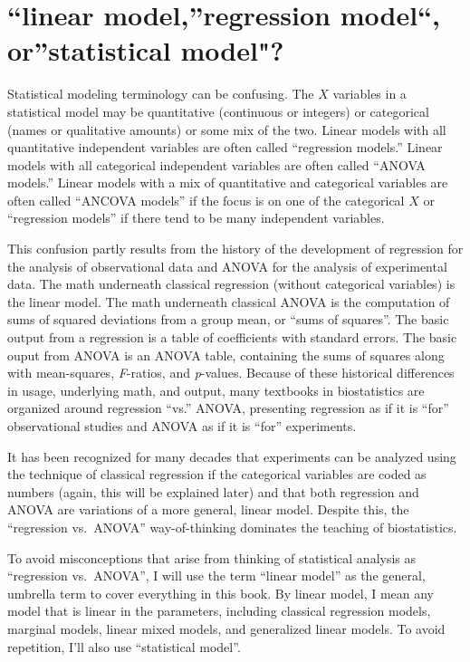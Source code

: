 \documentclass[]{book}
\begin{document}
\hypertarget{linear-modelregression-model-orstatistical-model}{%
\section{``linear model,''regression model``, or''statistical model"?}\label{linear-modelregression-model-orstatistical-model}}

Statistical modeling terminology can be confusing. The \(X\) variables in a statistical model may be quantitative (continuous or integers) or categorical (names or qualitative amounts) or some mix of the two. Linear models with all quantitative independent variables are often called ``regression models.'' Linear models with all categorical independent variables are often called ``ANOVA models.'' Linear models with a mix of quantitative and categorical variables are often called ``ANCOVA models'' if the focus is on one of the categorical \(X\) or ``regression models'' if there tend to be many independent variables.

This confusion partly results from the history of the development of regression for the analysis of observational data and ANOVA for the analysis of experimental data. The math underneath classical regression (without categorical variables) is the linear model. The math underneath classical ANOVA is the computation of sums of squared deviations from a group mean, or ``sums of squares''. The basic output from a regression is a table of coefficients with standard errors. The basic ouput from ANOVA is an ANOVA table, containing the sums of squares along with mean-squares, \emph{F}-ratios, and \emph{p}-values. Because of these historical differences in usage, underlying math, and output, many textbooks in biostatistics are organized around regression ``vs.'' ANOVA, presenting regression as if it is ``for'' observational studies and ANOVA as if it is ``for'' experiments.

It has been recognized for many decades that experiments can be analyzed using the technique of classical regression if the categorical variables are coded as numbers (again, this will be explained later) and that both regression and ANOVA are variations of a more general, linear model. Despite this, the ``regression vs.~ANOVA'' way-of-thinking dominates the teaching of biostatistics.

To avoid misconceptions that arise from thinking of statistical analysis as ``regression vs.~ANOVA'', I will use the term ``linear model'' as the general, umbrella term to cover everything in this book. By linear model, I mean any model that is linear in the parameters, including classical regression models, marginal models, linear mixed models, and generalized linear models. To avoid repetition, I'll also use ``statistical model''.
\end{document}
